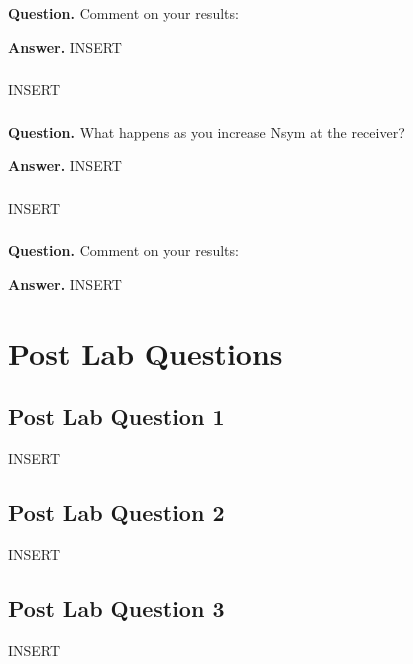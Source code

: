 \documentclass[11pt,a4paper]{article}
\begin{document}
\subsubsection{ }
\noindent\textbf{Question.} Comment on your results:

\noindent\textbf{Answer.} INSERT

\subsubsection{ }
INSERT

\subsubsection{ }
\noindent\textbf{Question.} What happens as you increase Nsym at the receiver?

\noindent\textbf{Answer.} INSERT

\subsubsection{ }
INSERT

\subsubsection{ }
\noindent\textbf{Question.} Comment on your results:

\noindent\textbf{Answer.} INSERT

\section{Post Lab Questions}

\subsection{Post Lab Question 1}
INSERT

\subsection{Post Lab Question 2}
INSERT

\subsection{Post Lab Question 3}
INSERT
\end{document}
